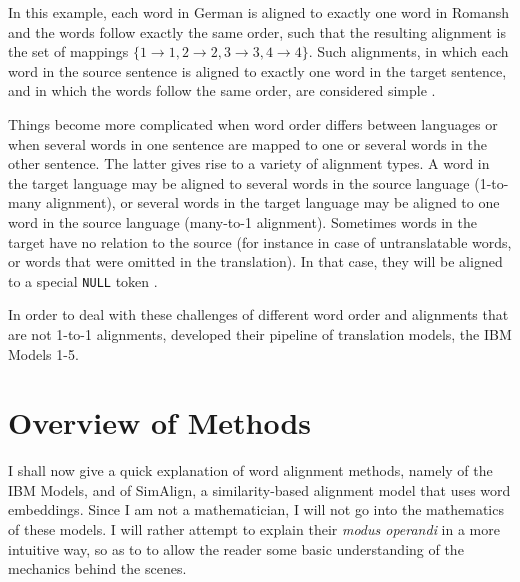 In this example, each word in German is aligned to exactly one word in Romansh and the words follow exactly the same order, such that the resulting alignment is the set of mappings $\{1\to1, 2\to2,3\to3,4\to4\}$. 
Such alignments, in which each word in the source sentence is aligned to exactly one word in the target sentence, and in which the words follow the same order, are considered simple \autocite[85]{koehn2009}.

Things become more complicated when word order differs between languages or when several words in one sentence are mapped to one or several words in the other sentence. 
The latter gives rise to a variety of alignment types. 
A word in the target language may be aligned to several words in the source language (1-to-many alignment), or several words in the target language may be aligned to one word in the source language (many-to-1 alignment). 
Sometimes words in the target have no relation to the source (for instance in case of untranslatable words, or words that were omitted in the translation). 
In that case, they will be aligned to a special \texttt{NULL} token \autocite[85]{koehn2009}. 


In order to deal with these challenges of different word order and alignments that are not 1-to-1 alignments, \cite{brown-etal-1993-mathematics} developed their pipeline of translation models, the IBM Models 1-5.

\section{Overview of Methods}
I shall now give a quick explanation of word alignment methods, namely of the IBM Models, and of SimAlign, a similarity-based alignment model that uses  word embeddings. 
Since I am not a mathematician, I will not go into the mathematics of these models. 
I will rather attempt to explain their \emph{modus operandi} in a more intuitive way, so as to to allow the reader some basic understanding of the mechanics behind the scenes.

